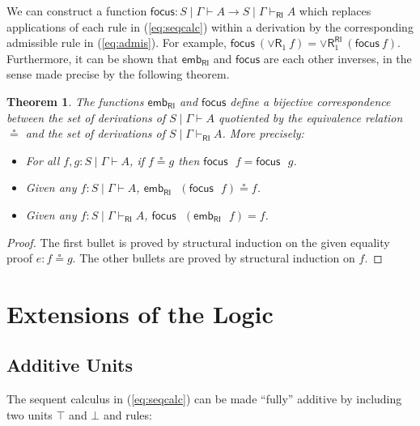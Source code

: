 \documentclass[submission,copyright,creativecommons]{eptcs}
\newtheorem{theorem}{Theorem}[section]
\theoremstyle{definition}
\newcommand{\orrone}{\lor \mathsf{R}_{1}}
\newcommand{\RI}{\mathsf{RI}}
\newcommand\cheng[1]{\mbox{}
{\marginpar{\color{blue}CSW}}
{\sf\noindent\color{blue}#1}}%
\begin{document}
We can construct a function $\mathsf{focus} : S \mid \Gamma \vdash A \to S \mid \Gamma \vdash_{\RI} A$ which replaces applications of each rule in (\ref{eq:seqcalc}) within a derivation by the corresponding admissible rule in (\ref{eq:admis}).
For example, $\mathsf{focus} \ (\orrone \ f) = \orrone^{\RI} \ (\mathsf{focus} \ f)$. Furthermore, it can be shown that $\mathsf{emb}_{\RI}$ and $\mathsf{focus}$ are each other inverses, in the sense made precise by the following theorem.
\begin{theorem}
  The functions $\mathsf{emb}_{\RI}$ and $\mathsf{focus}$ define a bijective correspondence between the set of derivations of $S \mid \Gamma \vdash A$ quotiented by the equivalence relation $\circeq$ and the set of derivations of $S \mid \Gamma \vdash_{\RI} A$. More precisely:
  \begin{itemize}
    \item For all $f, g : S \mid \Gamma \vdash A$, if $f \circeq g$ then $\mathsf{focus} \text{ } f = \mathsf{focus} \text{ } g$.
    \item Given any $f : S \mid \Gamma \vdash A$, $\mathsf{emb}_{\RI} \text{ } (\mathsf{focus} \text{ } f) \circeq f$.
    \item Given any $f : S \mid \Gamma \vdash_{\RI} A$, $\mathsf{focus} \text{ } (\mathsf{emb}_{\RI} \text{ } f) = f$.
  \end{itemize}
\end{theorem}
\begin{proof}
  The first bullet is proved by structural induction on the given equality proof $e : f \circeq g$. The other bullets are proved by structural induction on $f$.
\end{proof}

\section{Extensions of the Logic}\label{sec:extensions}

\subsection{Additive Units}\label{subsec:AddUnits}

The sequent calculus in (\ref{eq:seqcalc}) can be made ``fully'' additive by including two units $\top$ and $\bot$ %
and rules:
\end{document}
